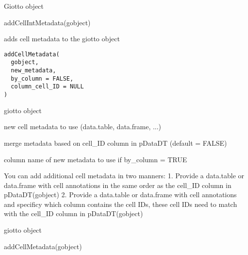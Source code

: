\documentclass[a4paper]{book}
\begin{document}
%
\begin{Value}
Giotto object
\end{Value}
%
\begin{Examples}
\begin{ExampleCode}
    addCellIntMetadata(gobject)
\end{ExampleCode}
\end{Examples}
%
\begin{Description}\relax
adds cell metadata to the giotto object
\end{Description}
%
\begin{Usage}
\begin{verbatim}
addCellMetadata(
  gobject,
  new_metadata,
  by_column = FALSE,
  column_cell_ID = NULL
)
\end{verbatim}
\end{Usage}
%
\begin{Arguments}
\begin{ldescription}
\item[\code{gobject}] giotto object

\item[\code{new\_metadata}] new cell metadata to use (data.table, data.frame, ...)

\item[\code{by\_column}] merge metadata based on cell\_ID column in pDataDT (default = FALSE)

\item[\code{column\_cell\_ID}] column name of new metadata to use if by\_column = TRUE
\end{ldescription}
\end{Arguments}
%
\begin{Details}\relax
You can add additional cell metadata in two manners:
1. Provide a data.table or data.frame with cell annotations in the same order as the cell\_ID column in pDataDT(gobject)
2. Provide a data.table or data.frame with cell annotations and specificy which column contains the cell IDs,
these cell IDs need to match with the cell\_ID column in pDataDT(gobject)
\end{Details}
%
\begin{Value}
giotto object
\end{Value}
%
\begin{Examples}
\begin{ExampleCode}
    addCellMetadata(gobject)
\end{ExampleCode}
\end{Examples}
\end{document}

